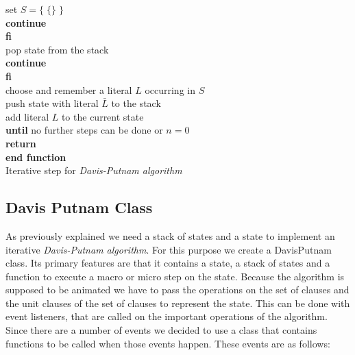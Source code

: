 \begin{listing}[h!]
                    \hspace*{2cm} set $S = \{\;\{\}\;\}$\\
                    \hspace*{2cm} \textbf{continue}\\
                \hspace*{1.5cm} \textbf{fi}\\
                \hspace*{1.5cm} pop state from the stack\\
                \hspace*{1.5cm} \textbf{continue}\\
            \hspace*{1.0cm} \textbf{fi}\\
            \hspace*{1.0cm} choose and remember a literal $L$ occurring in $S$\\
            \hspace*{1.0cm} push state with literal $\bar{L}$ to the stack\\
            \hspace*{1.0cm} add literal $L$ to the current state\\
        \hspace*{0.5cm} \textbf{until} no further steps can be done or $n = 0$\\
        \hspace*{0.5cm} \textbf{return}\\
    \textbf{end function}\\
    \caption{Iterative step for \textit{Davis-Putnam algorithm}}
    \label{code:stepDavisPutnam}
\end{listing}

\subsection{Davis Putnam Class}
\label{sub:impDavisPutnam}
As previously explained we need a stack of states and a state to implement an iterative \textit{Davis-Putnam algorithm}. For this purpose we create a DavisPutnam class. Its primary features are that it contains a state, a stack of states and a function to execute a macro or micro step on the state. Because the algorithm is supposed to be animated we have to pass the operations on the set of clauses and the unit clauses of the set of clauses to represent the state. This can be done with event listeners, that are called on the important operations of the algorithm. Since there are a number of events we decided to use a class that contains functions to be called when those events happen. These events are as follows:

